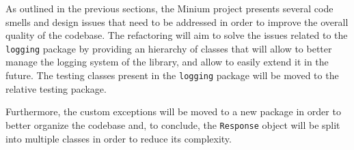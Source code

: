 As outlined in the previous sections, the Minium project presents several code smells and design issues that need to be addressed in order to improve the overall quality of the codebase. The refactoring will aim to solve the issues related to the \texttt{logging} package by providing an hierarchy of classes that will allow to better manage the logging system of the library, and allow to easily extend it in the future. The testing classes present in the \texttt{logging} package will be moved to the relative testing package.

Furthermore, the custom exceptions will be moved to a new package in order to better organize the codebase and, to conclude, the \texttt{Response} object will be split into multiple classes in order to reduce its complexity.

